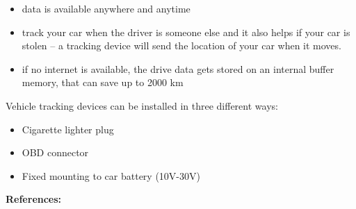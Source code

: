 \begin{singlespace}
\begin{itemize}
\item data is available anywhere and anytime
\item track your car when the driver is someone else and it also helps if your car is stolen – a tracking device will send the location of your car when it moves.
\item if no internet is available, the drive data gets stored on an internal buffer memory, that can save up to 2000 km
\end{itemize}
Vehicle tracking devices can be installed in three different ways:
\begin{itemize}
\item Cigarette lighter plug
\item OBD connector
\item Fixed mounting to car battery (10V-30V)
\end{itemize}
\textbf{References:} \cite{Maxtech}
\newpage
\clearpageauthor

\end{singlespace}
